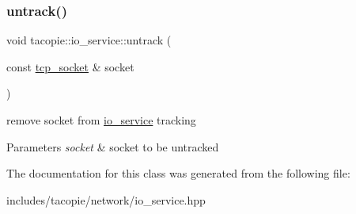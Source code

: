 \subsubsection{\texorpdfstring{untrack()}{untrack()}}
{\footnotesize\ttfamily void tacopie\+::io\+\_\+service\+::untrack (\begin{DoxyParamCaption}\item[{const \hyperlink{classtacopie_1_1tcp__socket}{tcp\+\_\+socket} \&}]{socket }\end{DoxyParamCaption})}

remove socket from \hyperlink{classtacopie_1_1io__service}{io\+\_\+service} tracking


\begin{DoxyParams}{Parameters}
{\em socket} & socket to be untracked \\
\hline
\end{DoxyParams}


The documentation for this class was generated from the following file\+:\begin{DoxyCompactItemize}
\item 
includes/tacopie/network/io\+\_\+service.\+hpp\end{DoxyCompactItemize}
